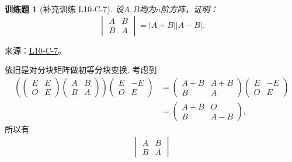 \documentclass[12pt,fontset=fandol]{ctexart}
\newtheorem{exercise}{训练题}[section]
\begin{document}
\begin{exercise}[补充训练 L10-C-7]\label{prob:L10-C-7}
设$A,B$均为$n$阶方阵，证明：
        \[\begin{vmatrix}
                A & B \\ B & A
            \end{vmatrix} = |A+B||A-B|.\]
\end{exercise}
\noindent 来源：\href{https://github.com/yhwu-is/Linear-Algebra-Left-Undone/blob/new/%E8%AE%B2%E4%B9%89/%E4%B8%93%E9%A2%98/10%20%E8%A1%8C%E5%88%97%E5%BC%8F.tex}{L10-C-7}。
\begin{solve}
依旧是对分块矩阵做初等分块变换. 考虑到
            \begin{align*}
                \left(\begin{pmatrix}
                            E & E \\
                            O & E
                        \end{pmatrix}
                \begin{pmatrix}
                    A & B \\
                    B & A
                \end{pmatrix} \right)
                \begin{pmatrix}
                    E & -E \\
                    O & E
                \end{pmatrix}
                & = \begin{pmatrix}
                        A+B & A+B \\
                        B   & A
                    \end{pmatrix}
                \begin{pmatrix}
                    E & -E \\
                    O & E
                \end{pmatrix}      \\
                & = \begin{pmatrix}
                        A+B & O   \\
                        B   & A-B
                    \end{pmatrix},
            \end{align*}
            所以有 \begin{align*}
                \begin{vmatrix}
                    A & B \\
                    B & A
                \end{vmatrix}

\end{align*}
\end{solve}
\end{document}
